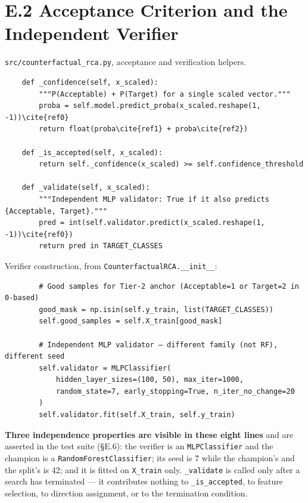 \hypertarget{e.2-acceptance-criterion-and-the-independent-verifier}{%
\section{E.2 Acceptance Criterion and the Independent Verifier}\label{e.2-acceptance-criterion-and-the-independent-verifier}}

\texttt{src/counterfactual\_rca.py}, acceptance and verification helpers.

\begin{verbatim}
    def _confidence(self, x_scaled):
        """P(Acceptable) + P(Target) for a single scaled vector."""
        proba = self.model.predict_proba(x_scaled.reshape(1, -1))\cite{ref0}
        return float(proba\cite{ref1} + proba\cite{ref2})

    def _is_accepted(self, x_scaled):
        return self._confidence(x_scaled) >= self.confidence_threshold

    def _validate(self, x_scaled):
        """Independent MLP validator: True if it also predicts {Acceptable, Target}."""
        pred = int(self.validator.predict(x_scaled.reshape(1, -1))\cite{ref0})
        return pred in TARGET_CLASSES
\end{verbatim}

Verifier construction, from \texttt{CounterfactualRCA.\_\_init\_\_}:

\begin{verbatim}
        # Good samples for Tier-2 anchor (Acceptable=1 or Target=2 in 0-based)
        good_mask = np.isin(self.y_train, list(TARGET_CLASSES))
        self.good_samples = self.X_train[good_mask]

        # Independent MLP validator — different family (not RF), different seed
        self.validator = MLPClassifier(
            hidden_layer_sizes=(100, 50), max_iter=1000,
            random_state=7, early_stopping=True, n_iter_no_change=20
        )
        self.validator.fit(self.X_train, self.y_train)
\end{verbatim}

\textbf{Three independence properties are visible in these eight lines} and are asserted in the test suite (§E.6): the verifier is an \texttt{MLPClassifier} and the champion is a \texttt{RandomForestClassifier}; its seed is 7 while the champion's and the split's is 42; and it is fitted on \texttt{X\_train} only. \texttt{\_validate} is called only after a search has terminated --- it contributes nothing to \texttt{\_is\_accepted}, to feature selection, to direction assignment, or to the termination condition.

